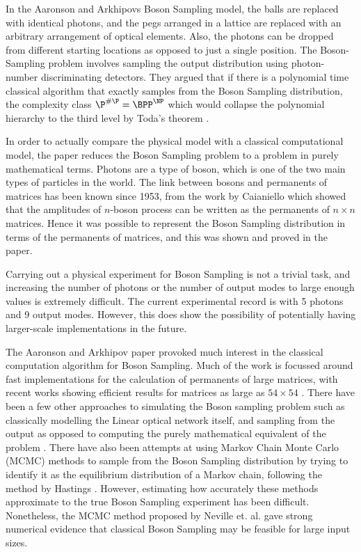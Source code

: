 \documentclass[ %
                    author={Manan Vaswani},
                supervisor={Dr. Raphael Clifford},
                    degree={MEng},
                     title={A multi-core CPU implementation \n of the classical Boson Sampling algorithm},
                  subtitle={},
                      type={},
                      year={2019} ]{dissertation}
\begin{document}
In the Aaronson and Arkhipovs Boson Sampling model, the balls are replaced with identical photons, and the pegs arranged in a lattice are replaced with an arbitrary arrangement of optical elements. Also, the photons can be dropped from different starting locations as opposed to just a single position. The Boson-Sampling problem involves sampling the output distribution using photon-number discriminating detectors. They argued that if there is a polynomial time classical algorithm that exactly samples from the Boson Sampling distribution, the complexity class $\P^{\#\P} = \BPP^{\NP} $  which would collapse the polynomial hierarchy to the third level by Toda's theorem \cite{toda1991}.

In order to actually compare the physical model with a classical computational model, the paper reduces the Boson Sampling problem to a problem in purely mathematical terms. Photons are a type of boson, which is one of the two main types of particles in the world. The link between bosons and permanents of matrices has been known since 1953, from the work by Caianiello \cite{Caianiello1953} which showed that the amplitudes of $n$-boson process can be written as the permanents of $n \times n$ matrices. Hence it was possible to represent the Boson Sampling distribution in terms of the permanents of matrices, and this was shown and proved in the paper.

Carrying out a physical experiment for Boson Sampling is not a trivial task, and increasing the number of photons or the number of output modes to large enough values is extremely difficult. The current experimental record is with 5 photons and 9 output modes. However, this does show the possibility of potentially having larger-scale implementations in the future.

The Aaronson and Arkhipov paper provoked much interest in the classical computation algorithm for Boson Sampling. Much of the work is focussed around fast implementations for the calculation of permanents of large matrices, with recent works showing efficient results for matrices as large as $54 \times 54$ \cite{roga2019, lundow2019}. There have been a few other approaches to simulating the Boson sampling problem such as classically modelling the Linear optical network itself, and sampling from the output as opposed to computing the purely mathematical equivalent of the problem \cite{rahimi2016}. There have also been attempts at using Markov Chain Monte Carlo (MCMC) methods to sample from the Boson Sampling distribution by trying to identify it as the equilibrium distribution of a Markov chain, following the method by Hastings \cite{hastings1970}. However, estimating how accurately these methods approximate to the true Boson Sampling experiment has been difficult. Nonetheless, the MCMC method proposed by Neville et. al. \cite{neville2017} gave strong numerical evidence that classical Boson Sampling may be feasible for large input sizes.
\end{document}
